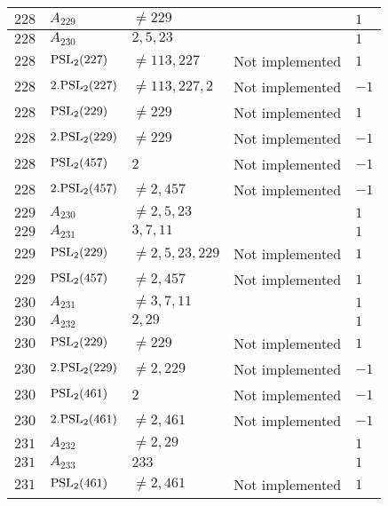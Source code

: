 \documentclass[a4paper, 11pt]{article}
\begin{document}
\begin{longtable}{lllll}
        $ 228 $ & $ A_{229} $ & $ \neq 229 $ & $ ~ $ & $ 1  $ \\ \hline
        $ 228 $ & $ A_{230} $ & $ 2, 5, 23 $ & $ ~ $ & $ 1  $ \\ \hline
        $ 228 $ & $ {\rm PSL}_{2}(227) $ & $ \neq 113, 227 $ & Not implemented & $ 1  $ \\ \hline
        $ 228 $ & $ 2.{\rm PSL}_{2}(227) $ & $ \neq 113, 227, 2 $ & Not implemented & $ -1  $ \\ \hline
        $ 228 $ & $ {\rm PSL}_{2}(229) $ & $ \neq 229 $ & Not implemented & $ 1  $ \\ \hline
        $ 228 $ & $ 2.{\rm PSL}_{2}(229) $ & $ \neq 229 $ & Not implemented & $ -1  $ \\ \hline
        $ 228 $ & $ {\rm PSL}_{2}(457) $ & $ 2 $ & Not implemented & $ -1  $ \\ \hline
        $ 228 $ & $ 2.{\rm PSL}_{2}(457) $ & $ \neq 2, 457 $ & Not implemented & $ -1  $ \\ \hline
        $ 229 $ & $ A_{230} $ & $ \neq 2, 5, 23 $ & $ ~ $ & $ 1  $ \\ \hline
        $ 229 $ & $ A_{231} $ & $ 3, 7, 11 $ & $ ~ $ & $ 1  $ \\ \hline
        $ 229 $ & $ {\rm PSL}_{2}(229) $ & $ \neq 2, 5, 23, 229 $ & Not implemented & $ 1  $ \\ \hline
        $ 229 $ & $ {\rm PSL}_{2}(457) $ & $ \neq 2, 457 $ & Not implemented & $ 1  $ \\ \hline
        $ 230 $ & $ A_{231} $ & $ \neq 3, 7, 11 $ & $ ~ $ & $ 1  $ \\ \hline
        $ 230 $ & $ A_{232} $ & $ 2, 29 $ & $ ~ $ & $ 1  $ \\ \hline
        $ 230 $ & $ {\rm PSL}_{2}(229) $ & $ \neq 229 $ & Not implemented & $ 1  $ \\ \hline
        $ 230 $ & $ 2.{\rm PSL}_{2}(229) $ & $ \neq 2, 229 $ & Not implemented & $ -1  $ \\ \hline
        $ 230 $ & $ {\rm PSL}_{2}(461) $ & $ 2 $ & Not implemented & $ -1  $ \\ \hline
        $ 230 $ & $ 2.{\rm PSL}_{2}(461) $ & $ \neq 2, 461 $ & Not implemented & $ -1  $ \\ \hline
        $ 231 $ & $ A_{232} $ & $ \neq 2, 29 $ & $ ~ $ & $ 1  $ \\ \hline
        $ 231 $ & $ A_{233} $ & $ 233 $ & $ ~ $ & $ 1  $ \\ \hline
        $ 231 $ & $ {\rm PSL}_{2}(461) $ & $ \neq 2, 461 $ & Not implemented & $ 1  $ \\ \hline

\end{longtable}
\end{document}
